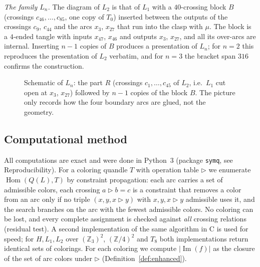 \documentclass[11pt]{article}
\theoremstyle{definition}
\newcommand{\Z}{\mathbb{Z}}
\newcommand{\Hom}{\operatorname{Hom}}
\renewcommand{\Im}{\operatorname{Im}}
\newcommand{\tr}{\triangleright}
\begin{document}
\emph{The family $L_n$.} The diagram of $L_2$ is that of $L_1$ with a $40$-crossing block $B$
(crossings $c_{46},\dots,c_{85}$, one copy of $T_0$) inserted between the outputs of the crossings
$c_9$, $c_{44}$ and the arcs $x_3$, $x_{27}$ that run into the clasp with $\mu$. The block is a
$4$-ended tangle with inputs $x_{47}$, $x_{46}$ and outputs $x_3$, $x_{27}$, and all its over-arcs are
internal. Inserting $n-1$ copies of $B$ produces a presentation of $L_n$; for $n=2$ this reproduces the
presentation of $L_2$ verbatim, and for $n=3$ the bracket span $316$ confirms the construction.

\begin{figure}[h]
\centering
{}
\caption{Schematic of $L_n$: the part $R$ (crossings $c_1,\dots,c_{45}$ of $L_2$, i.e.\ $L_1$ cut open
at $x_3$, $x_{27}$) followed by $n-1$ copies of the block $B$. The picture only records how the four
boundary arcs are glued, not the geometry.}
\label{fig:transfer}
\end{figure}

\subsection{Computational method}\label{ssec:method}

All computations are exact and were done in Python~3 (package \texttt{symq}, see Reproducibility).
For a coloring quandle $T$ with operation table $\tr$ we enumerate $\Hom(Q(L),T)$ by constraint
propagation: each arc carries a set of admissible colors, each crossing $a\tr b=c$ is a constraint
that removes a color from an arc only if no triple $(x,y,x\tr y)$ with $x,y,x\tr y$ admissible uses it,
and the search branches on the arc with the fewest admissible colors. No coloring can be lost, and
every complete assignment is checked against \emph{all} crossing relations (residual test). A second
implementation of the same algorithm in C is used for speed; for $H,L_1,L_2$ over $(\Z_3)^2$, $(\Z/4)^2$
and $T_8$ both implementations return identical sets of colorings. For each coloring we compute $|\Im(f)|$ as the closure of the set of arc
colors under $\tr$ (Definition~\ref{def:enhanced}).
\end{document}
